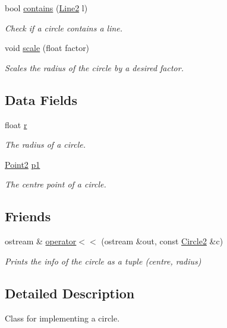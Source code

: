 \begin{DoxyCompactItemize}
bool \mbox{\hyperlink{class_circle2_ad79e383e3e070f5884c61fc8753627c0}{contains}} (\mbox{\hyperlink{class_line2}{Line2}} l)
\begin{DoxyCompactList}\small\item\em Check if a circle contains a line. \end{DoxyCompactList}\item 
void \mbox{\hyperlink{class_circle2_aef5dc310f0f5bc259e49b5c44dee40b9}{scale}} (float factor)
\begin{DoxyCompactList}\small\item\em Scales the radius of the circle by a desired factor. \end{DoxyCompactList}\end{DoxyCompactItemize}
\subsection*{Data Fields}
\begin{DoxyCompactItemize}
\item 
float \mbox{\hyperlink{class_circle2_a3529394e7c9960e081b726fb9f7a27cb}{r}}
\begin{DoxyCompactList}\small\item\em The radius of a circle. \end{DoxyCompactList}\item 
\mbox{\hyperlink{class_point2}{Point2}} \mbox{\hyperlink{class_circle2_ae041646719f802ae427599e07a61a513}{p1}}
\begin{DoxyCompactList}\small\item\em The centre point of a circle. \end{DoxyCompactList}\end{DoxyCompactItemize}
\subsection*{Friends}
\begin{DoxyCompactItemize}
\item 
ostream \& \mbox{\hyperlink{class_circle2_a4ccba61b3b68a4c389c0ec160f975b2b}{operator$<$$<$}} (ostream \&out, const \mbox{\hyperlink{class_circle2}{Circle2}} \&c)
\begin{DoxyCompactList}\small\item\em Prints the info of the circle as a tuple (centre, radius) \end{DoxyCompactList}\end{DoxyCompactItemize}


\subsection{Detailed Description}
Class for implementing a circle. 

